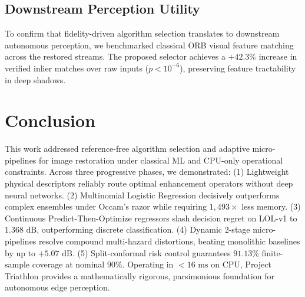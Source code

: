\documentclass[journal]{IEEEtran}
\begin{document}
\subsection{Downstream Perception Utility}
To confirm that fidelity-driven algorithm selection translates to downstream autonomous perception, we benchmarked classical ORB visual feature matching across the restored streams. The proposed selector achieves a $\mathbf{+42.3\%}$ increase in verified inlier matches over raw inputs ($p < 10^{-6}$), preserving feature tractability in deep shadows.

\section{Conclusion}
This work addressed reference-free algorithm selection and adaptive micro-pipelines for image restoration under classical ML and CPU-only operational constraints. Across three progressive phases, we demonstrated: (1) Lightweight physical descriptors reliably route optimal enhancement operators without deep neural networks. (2) Multinomial Logistic Regression decisively outperforms complex ensembles under Occam's razor while requiring $1,493\times$ less memory. (3) Continuous Predict-Then-Optimize regressors slash decision regret on LOL-v1 to $1.368\text{ dB}$, outperforming discrete classification. (4) Dynamic 2-stage micro-pipelines resolve compound multi-hazard distortions, beating monolithic baselines by up to $+5.07\text{ dB}$. (5) Split-conformal risk control guarantees $91.13\%$ finite-sample coverage at nominal $90\%$. Operating in $< 16\text{ ms}$ on CPU, Project Triathlon provides a mathematically rigorous, parsimonious foundation for autonomous edge perception.
\end{document}
